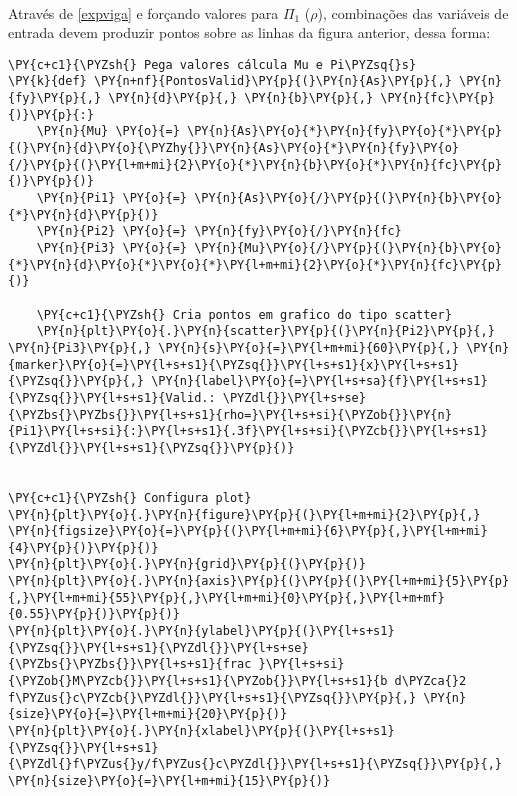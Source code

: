     \begin{center}
    \end{center}
    { \hspace*{\fill} \\}
    
    Através de \ref{expviga} e forçando valores para \(\Pi_1\) (\(\rho\)),
combinações das variáveis de entrada devem produzir pontos sobre as
linhas da figura anterior, dessa forma:

    \begin{tcolorbox}[breakable, size=fbox, boxrule=1pt, pad at break*=1mm,colback=cellbackground, colframe=cellborder]
\begin{Verbatim}[commandchars=\\\{\}]
\PY{c+c1}{\PYZsh{} Pega valores cálcula Mu e Pi\PYZsq{}s}
\PY{k}{def} \PY{n+nf}{PontosValid}\PY{p}{(}\PY{n}{As}\PY{p}{,} \PY{n}{fy}\PY{p}{,} \PY{n}{d}\PY{p}{,} \PY{n}{b}\PY{p}{,} \PY{n}{fc}\PY{p}{)}\PY{p}{:}
    \PY{n}{Mu} \PY{o}{=} \PY{n}{As}\PY{o}{*}\PY{n}{fy}\PY{o}{*}\PY{p}{(}\PY{n}{d}\PY{o}{\PYZhy{}}\PY{n}{As}\PY{o}{*}\PY{n}{fy}\PY{o}{/}\PY{p}{(}\PY{l+m+mi}{2}\PY{o}{*}\PY{n}{b}\PY{o}{*}\PY{n}{fc}\PY{p}{)}\PY{p}{)}
    \PY{n}{Pi1} \PY{o}{=} \PY{n}{As}\PY{o}{/}\PY{p}{(}\PY{n}{b}\PY{o}{*}\PY{n}{d}\PY{p}{)}
    \PY{n}{Pi2} \PY{o}{=} \PY{n}{fy}\PY{o}{/}\PY{n}{fc}
    \PY{n}{Pi3} \PY{o}{=} \PY{n}{Mu}\PY{o}{/}\PY{p}{(}\PY{n}{b}\PY{o}{*}\PY{n}{d}\PY{o}{*}\PY{o}{*}\PY{l+m+mi}{2}\PY{o}{*}\PY{n}{fc}\PY{p}{)}
    
    \PY{c+c1}{\PYZsh{} Cria pontos em grafico do tipo scatter}
    \PY{n}{plt}\PY{o}{.}\PY{n}{scatter}\PY{p}{(}\PY{n}{Pi2}\PY{p}{,} \PY{n}{Pi3}\PY{p}{,} \PY{n}{s}\PY{o}{=}\PY{l+m+mi}{60}\PY{p}{,} \PY{n}{marker}\PY{o}{=}\PY{l+s+s1}{\PYZsq{}}\PY{l+s+s1}{x}\PY{l+s+s1}{\PYZsq{}}\PY{p}{,} \PY{n}{label}\PY{o}{=}\PY{l+s+sa}{f}\PY{l+s+s1}{\PYZsq{}}\PY{l+s+s1}{Valid.: \PYZdl{}}\PY{l+s+se}{\PYZbs{}\PYZbs{}}\PY{l+s+s1}{rho=}\PY{l+s+si}{\PYZob{}}\PY{n}{Pi1}\PY{l+s+si}{:}\PY{l+s+s1}{.3f}\PY{l+s+si}{\PYZcb{}}\PY{l+s+s1}{\PYZdl{}}\PY{l+s+s1}{\PYZsq{}}\PY{p}{)}
    
    
\PY{c+c1}{\PYZsh{} Configura plot}
\PY{n}{plt}\PY{o}{.}\PY{n}{figure}\PY{p}{(}\PY{l+m+mi}{2}\PY{p}{,} \PY{n}{figsize}\PY{o}{=}\PY{p}{(}\PY{l+m+mi}{6}\PY{p}{,}\PY{l+m+mi}{4}\PY{p}{)}\PY{p}{)}
\PY{n}{plt}\PY{o}{.}\PY{n}{grid}\PY{p}{(}\PY{p}{)}
\PY{n}{plt}\PY{o}{.}\PY{n}{axis}\PY{p}{(}\PY{p}{(}\PY{l+m+mi}{5}\PY{p}{,}\PY{l+m+mi}{55}\PY{p}{,}\PY{l+m+mi}{0}\PY{p}{,}\PY{l+m+mf}{0.55}\PY{p}{)}\PY{p}{)}
\PY{n}{plt}\PY{o}{.}\PY{n}{ylabel}\PY{p}{(}\PY{l+s+s1}{\PYZsq{}}\PY{l+s+s1}{\PYZdl{}}\PY{l+s+se}{\PYZbs{}\PYZbs{}}\PY{l+s+s1}{frac }\PY{l+s+si}{\PYZob{}M\PYZcb{}}\PY{l+s+s1}{\PYZob{}}\PY{l+s+s1}{b d\PYZca{}2 f\PYZus{}c\PYZcb{}\PYZdl{}}\PY{l+s+s1}{\PYZsq{}}\PY{p}{,} \PY{n}{size}\PY{o}{=}\PY{l+m+mi}{20}\PY{p}{)}
\PY{n}{plt}\PY{o}{.}\PY{n}{xlabel}\PY{p}{(}\PY{l+s+s1}{\PYZsq{}}\PY{l+s+s1}{\PYZdl{}f\PYZus{}y/f\PYZus{}c\PYZdl{}}\PY{l+s+s1}{\PYZsq{}}\PY{p}{,} \PY{n}{size}\PY{o}{=}\PY{l+m+mi}{15}\PY{p}{)}


\end{Verbatim}
\end{tcolorbox}
